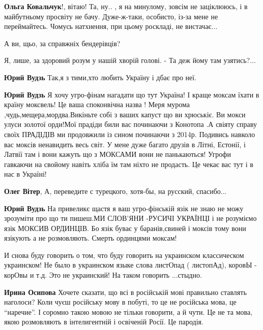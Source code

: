 \begin{itemize}
{\begin{itemize}

\textbf{Ольга Ковальчук}!, вітаю!  Та, ну.. , я на минулому, зовсім не заціклююсь, і в
майбутньому просвіту не бачу. Дуже-ж-таки, особисто, із-за мене не
переймайтесь.  Чомусь натхнення, при цьому роскладі, не вистачає...

А ви, щьо, за справжніх бендерівців?

Я, лише, за здоровий розум у нашій хворій голові.
- Та деж йому там узятись?...

\textbf{Юрий Вудзь} Так,я з тими,хто любить Україну і дбає про неї.

\textbf{Юрий Вудзь} Я хочу угро-фінам нагадати що тут Україна! І краще моксам
їхати в країну моксвель! Це ваша споконвічна назва ! Меря мурома
,чудь,мещера,мордва.Викіньте собі з ваших капуст що ви хрюськіє. Ви мокси улуси
золотої орди!Мої прадіди били вас починаючи з Конотопа .А свіяту справу своїх
ПРАДІДІВ ми продовжили із сином починаючи з 2014р. Подивись навколо вас моксів
ненавидить весь світ. У мене дуже багато друзів в Літні, Естонії, і Латвії там
і вони кажуть що з МОКСАМИ вони не панькаються! Угрофи гавкаючи на свойому
навіть хліба їм там ніхто не продасть. Це чекає вас тут і в нас в Україні!

\textbf{Олег Вітер},
А, переведите с турецкого, хотя-бы, на русский, спасибо...

\textbf{Юрий Вудзь} На привеликє щастя я ваш угро-фінській язік не знаю не можу
зрозуміти про що ти пишеш.МИ СЛОВ'ЯНИ -РУСИЧІ УКРАЇНЦІ і не розуміємо язік
МОКСИВ ОРДИНЦІВ. Бо язік буває у баранів,свиней і моксів тому вони язікують а
не розмовляють. Смерть ординцями моксам!
\end{itemize}


И снова буду говорить о том, что буду говорить на украинском классическом
украинском! Не было в украинском языке слова листОпад ( листопАд), коровЫ -
корОвы и т.д. Это не украинский! На таком говорить ...стыдно.

\begin{itemize}

\textbf{Ирина Осипова} Хочете сказати, що всі в російській мові правильно ставлять
наголоси? Коли чуєш російську мову в побуті, то це не російська мова, це
\enquote{наречие}. І соромно такою мовою не тільки говорити, а й чути. Це не та мова,
якою розмовляють в інтелигентній і освіченій Росії. Це пародія.


\end{itemize}}
\end{itemize}
